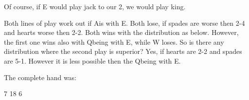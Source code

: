 \documentclass[12pt, a4paper]{article}
\begin{document}
Of course, if E would play jack to our 2\diams, we would
play king.

\vspace{0.2cm}

Both lines of play work out if A\diams is with E.
Both lose, if spades are worse then 2-4 and hearts worse then 2-2. Both wins
with the distribution as below. However, the first one
wins also with Q\diams being with E, while W loses.
So is there any distribution where the second play
is superior? Yes, if hearts are 2-2 and spades are 5-1.
However it is less possible then the Q\diams being with E.

\vspace{0.2cm}

The complete hand was:

        {}{7}
        {}{18}
        {}{6}
        {}
\end{document}
